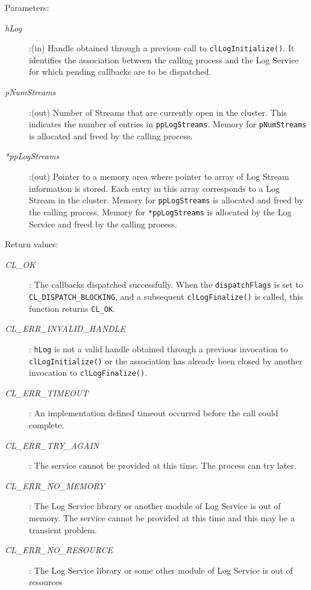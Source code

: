 \begin{flushleft}
\begin{Desc}
\begin{verbatim}
\end{verbatim}
\normalsize
\end{Desc}
\begin{Desc}
\item[Parameters:] \begin{description}
\item[{\em hLog}]:(in) Handle obtained through a previous call to {\tt{clLogInitialize()}}. It identifies the association between the calling process and 
the Log Service for which pending callbacks are to be dispatched.
\item[{\em *pNumStreams}]:(out) Number of Streams that are currently open in the cluster. This indicates the number of entries in {\tt{ppLogStreams}}.
Memory for {\tt{pNumStreams}} is allocated and freed by the calling process.
\item[{\em **ppLogStreams}]:(out) Pointer to a memory area where pointer to array of Log Stream information is stored. Each entry in this array 
corresponds to a Log Stream in the cluster. Memory for {\tt{ppLogStreams}} is allocated and freed by the calling process. Memory for {\tt{*ppLogStreams}} 
is allocated by the Log Service and freed by the calling process.
\end{description}
\end{Desc}
\begin{Desc}
\item[Return values:]
\begin{description}
\item[{\em CL\_\-OK}]: The callbacks dispatched successfully. When the {\tt{dispatchFlags}} is set to {\tt{CL\_\-DISPATCH\_\-BLOCKING}}, and a subsequent
{\tt{clLogFinalize()}} is called, this function returns {\tt{CL\_\-OK}}.
\item[{\em CL\_\-ERR\_\-INVALID\_\-HANDLE}]: {\tt{hLog}} is not a valid handle obtained through a previous invocation to 
{\tt{clLogInitialize()}} or the association has already been closed by another invocation to {\tt{clLogFinalize()}}.
\item[{\em CL\_\-ERR\_\-TIMEOUT}]: An implementation defined timeout occurred before the call could complete.
\item[{\em CL\_\-ERR\_\-TRY\_\-AGAIN}]: The service cannot be provided at this time. The process can try later.
\item[{\em CL\_\-ERR\_\-NO\_\-MEMORY}]: The Log Service library or another module of Log Service is out of memory. The service cannot 
be provided at this time and this may be a transient problem.
\item[{\em CL\_\-ERR\_\-NO\_\-RESOURCE}]: The Log Service library or some other module of Log Service is out of resources 

\end{description}
\end{Desc}
\end{flushleft}
